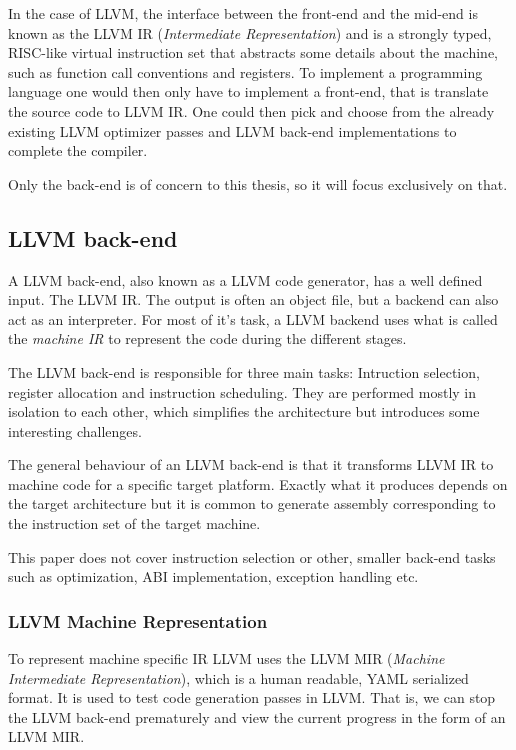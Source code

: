 In the case of LLVM, the interface between the front-end and the mid-end is known as the
LLVM IR (\textit{Intermediate Representation}) and is a strongly typed, RISC-like virtual
instruction set that abstracts some details about the machine, such as function call
conventions and registers. To implement a programming language one would then only have to
implement a front-end, that is translate the source code to LLVM IR. One could then pick
and choose from the already existing LLVM optimizer passes and LLVM back-end implementations
to complete the compiler.

Only the back-end is of concern to this thesis, so it will focus exclusively on that.

\subsection{LLVM back-end}

A LLVM back-end, also known as a LLVM code generator, has a well defined input. The
LLVM IR. The output is often an object file, but a backend can also act as an interpreter.
For most of it's task, a LLVM backend uses what is called the \textit{machine IR} to represent
the code during the different stages.

The LLVM back-end is responsible for three main tasks: Intruction selection, register
allocation and instruction scheduling. They are performed mostly in isolation to each
other, which simplifies the architecture but introduces some interesting challenges.

The general behaviour of an LLVM back-end is that it transforms LLVM IR to machine code
for a specific target platform. Exactly what it produces depends on the target architecture
but it is common to generate assembly corresponding to the instruction set of the target
machine.

This paper does not cover instruction selection or other, smaller back-end tasks such as
optimization, ABI implementation, exception handling etc.

\subsubsection{LLVM Machine Representation}

To represent machine specific IR LLVM uses the LLVM MIR (\textit{Machine Intermediate Representation}),
which is a human readable, YAML serialized format. It is used to test code generation
passes in LLVM. That is, we can stop the LLVM back-end prematurely and view the current
progress in the form of an LLVM MIR.

